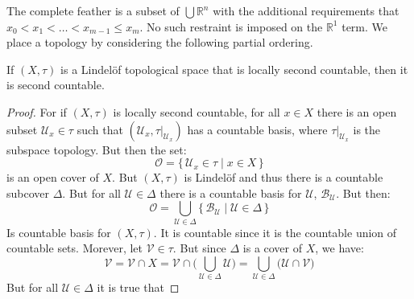 \documentclass{article}                                                        %
\begin{document}
        The complete feather is a subset of $\bigcup\mathbb{R}^{n}$ with the
        additional requirements that $x_{0}<x_{1}<\dots<x_{m-1}\leq{x}_{m}$.
        No such restraint is imposed on the $\mathbb{R}^{1}$ term. We place
        a topology by considering the following partial ordering.
        \begin{theorem}
                If $(X,\tau)$ is a Lindel\"{o}f topological space that is
                locally second countable, then it is second countable.
        \end{theorem}
        \begin{proof}
                For if $(X,\tau)$ is locally second countable, for all $x\in{X}$
                there is an open subset $\mathcal{U}_{x}\in\tau$ such that
                $(\mathcal{U}_{x},\tau|_{\mathcal{U}_{x}})$ has a countable
                basis, where $\tau|_{\mathcal{U}_{x}}$ is the subspace topology.
                But then the set:
                \begin{equation}
                    \mathcal{O}=
                    \{\,\mathcal{U}_{x}\in\tau\;|\;x\in{X}\,\}
                \end{equation}
                is an open cover of $X$. But $(X,\tau)$ is Lindel\"{o}f and thus
                there is a countable subcover $\Delta$. But for all
                $\mathcal{U}\in\Delta$ there is a countable basis for
                $\mathcal{U}$, $\mathscr{B}_{\mathcal{U}}$. But then:
                \begin{equation}
                    \mathscr{O}=
                    \bigcup_{\mathcal{U}\in\Delta}
                        \{\,\mathscr{B}_{\mathcal{U}}\;|\;
                            \mathcal{U}\in\Delta\,\}
                \end{equation}
                Is countable basis for $(X,\tau)$. It is countable since it is
                the countable union of countable sets. Morever, let
                $\mathcal{V}\in\tau$. But since $\Delta$ is a cover of $X$, we
                have:
                \begin{equation}
                    \mathcal{V}
                    =\mathcal{V}\cap{X}
                    =\mathcal{V}\cap\Big(
                        \bigcup_{\mathcal{U}\in\Delta}\mathcal{U}
                    \Big)
                    =\bigcup_{\mathcal{U}\in\Delta}\big(
                        \mathcal{U}\cap\mathcal{V}
                    \big)
                \end{equation}
                But for all $\mathcal{U}\in\Delta$ it is true that

\end{proof}
\end{document}
